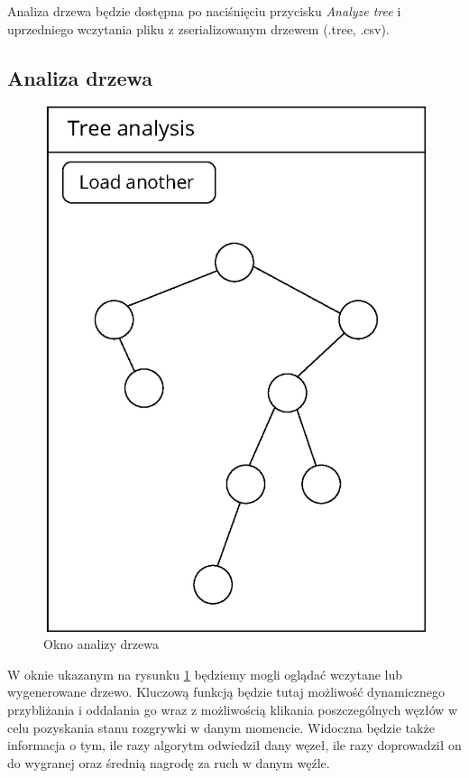 \documentclass{article}
\begin{document}
	\noindent Analiza drzewa będzie dostępna po naciśnięciu przycisku \textit{Analyze tree} i uprzedniego wczytania pliku z zserializowanym drzewem (.tree, .csv).
	
	\clearpage
	\subsection{Analiza drzewa}
	\begin{figure}[h!]
		\centering
		\includegraphics[scale=0.8]{analyze-eps}
		\caption{Okno analizy drzewa}
		\label{rys:analyze_tree}
	\end{figure}
	
	\noindent W oknie ukazanym na rysunku \ref{rys:analyze_tree} będziemy mogli oglądać wczytane lub wygenerowane drzewo. Kluczową funkcją będzie tutaj możliwość dynamicznego przybliżania i oddalania go wraz z możliwością klikania poszczególnych węzłów w celu pozyskania stanu rozgrywki w danym momencie. Widoczna będzie także informacja o tym, ile razy algorytm odwiedził dany węzeł, ile razy doprowadził on do wygranej oraz średnią nagrodę za ruch w danym węźle.
	
\end{document}
